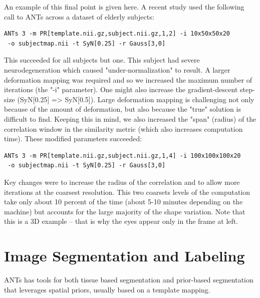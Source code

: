 \documentclass{InsightArticle}
\begin{document}
An example of this final point is given here.   
A recent study used the following call to ANTs across a dataset of elderly subjects:
\begin{verbatim}
ANTs 3 -m PR[template.nii.gz,subject.nii.gz,1,2] -i 10x50x50x20
 -o subjectmap.nii -t SyN[0.25] -r Gauss[3,0]
\end{verbatim}
This succeeded for all subjects but one.  This subject had severe neurodegeneration which caused "under-normalization" to result.  A larger deformation mapping was required and so we increased the maximum number of iterations (the "-i" parameter).  One might also increase the gradient-descent step-size (SyN[0.25] => SyN[0.5]).   Large deformation mapping is challenging not only because of the amount of deformation, but also because the "true" solution is difficult to find.  Keeping this in mind, we also increased the "span" (radius) of the correlation window in the similarity metric (which also increases computation time). These modified parameters succeeded: 
\begin{verbatim}
ANTs 3 -m PR[template.nii.gz,subject.nii.gz,1,4] -i 100x100x100x20
 -o subjectmap.nii -t SyN[0.25] -r Gauss[3,0] 
\end{verbatim}
Key changes were to increase the radius of the correlation and to
allow more iterations at the coarsest resolution.  
This two coarsets levels of the computation take only about
10 percent of the time (about 5-10 minutes depending on the machine)
but accounts for the large majority of the shape variation.  Note that
this is a 3D example -- that is why the eyes appear only in the frame
at left. 
\newpage
\section{Image Segmentation and Labeling}
ANTs has tools for both tissue based segmentation and prior-based segmentation that 
leverages spatial priors, usually based on a template mapping.  
\end{document}
